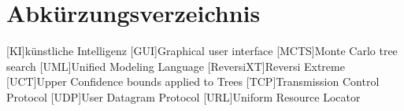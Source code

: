 \documentclass[12pt,a4paper,bibliography=totocnumbered,listof=totocnumbered]{article}
\begin{document}

\lhead{}
\section{Abkürzungsverzeichnis}
\begin{acronym}[KDE]
[KI]{künstliche Intelligenz}
[GUI]{Graphical user interface}
[MCTS]{Monte Carlo tree search}
[UML]{Unified Modeling Language}
[ReversiXT]{Reversi Extreme}
[UCT]{Upper Confidence bounds applied to Trees}
[TCP]{Transmission Control Protocol}
[UDP]{User Datagram Protocol}
[URL]{Uniform Resource Locator}
\end{acronym}
\pagebreak



\renewcommand{\sectionmark}[1]{\markright{#1}}
\renewcommand{\subsectionmark}[1]{}
\renewcommand{\subsubsectionmark}[1]{}
\rhead{\rightmark}
\end{document}
